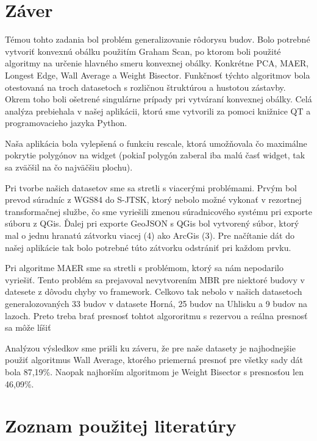 \documentclass[12pt]{article}
\begin{document}
\section*{Záver}
Témou tohto zadania bol problém generalizovanie rôdorysu budov. Bolo potrebné vytvoriť konvexnú obálku použitím Graham Scan, po ktorom boli použité algoritmy na určenie hlavného smeru konvexnej obálky. Konkrétne PCA, MAER, Longest Edge, Wall Average a Weight Bisector. Funkčnosť týchto algoritmov bola otestovaná na troch datasetoch s rozličnou štruktúrou a hustotou zástavby. Okrem toho boli ošetrené singulárne prípady pri vytváraní konvexnej obálky. Celá analýza prebiehala v našej aplikácii, ktorú sme vytvorili za pomoci knižnice QT a programovacieho jazyka Python.\par
Naša aplikácia bola vylepšená o funkciu rescale, ktorá umožňovala čo maximálne pokrytie polygónov na widget (pokiaľ polygón zaberal iba malú časť widget, tak sa zväčšil na čo najväčšiu plochu).\par
Pri tvorbe našich datasetov sme sa stretli s viacerými problémami. Prvým bol prevod súradníc z WGS84 do S-JTSK, ktorý nebolo možné vykonať v rezortnej transformačnej službe, čo sme vyriešili zmenou súradnicového systému pri exporte súboru z QGis. Ďalej pri exporte GeoJSON s QGis bol vytvorený súbor, ktorý mal o jednu hranatú zátvorku viacej (4) ako ArcGis (3). Pre načítanie dát do našej aplikácie tak bolo potrebné túto zátvorku odstrániť pri každom prvku. \par
Pri algoritme MAER sme sa stretli s problémom, ktorý sa nám nepodarilo vyriešiť. Tento problém sa prejavoval nevytvorením MBR pre niektoré budovy v datesete z dôvodu chyby vo framework. Celkovo tak nebolo v našich datasetoch generalozovaných 33 budov v datasete Horná,  25 budov na Uhlisku a 9 budov na lazoch. Preto treba brať presnosť tohtot algororitmu s rezervou a reálna presnosť sa môže líšiť  \par
Analýzou výsledkov sme prišli ku záveru, že pre naše datasety je najhodnejšie použiť algoritmus Wall Average, ktorého priemerná presnoť pre všetky sady dát bola  87,19\%. Naopak najhorším algoritmom je Weight Bisector s presnosťou len 46,09\%. 





\newpage
\section*{Zoznam použitej literatúry}
\end{document}
